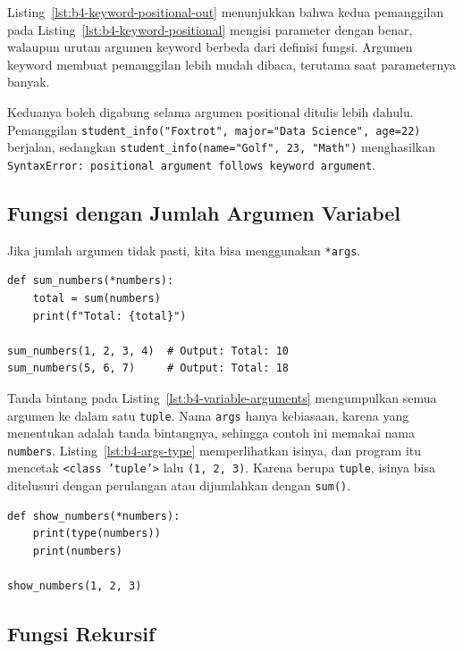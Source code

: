 Listing~\ref{lst:b4-keyword-positional-out} menunjukkan bahwa kedua pemanggilan pada Listing~\ref{lst:b4-keyword-positional} mengisi parameter dengan benar, walaupun urutan argumen keyword berbeda dari definisi fungsi. Argumen keyword membuat pemanggilan lebih mudah dibaca, terutama saat parameternya banyak.

Keduanya boleh digabung selama argumen positional ditulis lebih dahulu. Pemanggilan \texttt{student_info("Foxtrot", major="Data Science", age=22)} berjalan, sedangkan \texttt{student_info(name="Golf", 23, "Math")} menghasilkan \texttt{SyntaxError: positional argument follows keyword argument}.

\subsection{Fungsi dengan Jumlah Argumen Variabel}

Jika jumlah argumen tidak pasti, kita bisa menggunakan \texttt{*args}.

\begin{lstlisting}[style=PythonStyle, caption={Kode Python: function_with_variable_arguments.py}, label={lst:b4-variable-arguments}]
def sum_numbers(*numbers):
    total = sum(numbers)
    print(f"Total: {total}")

sum_numbers(1, 2, 3, 4)  # Output: Total: 10
sum_numbers(5, 6, 7)     # Output: Total: 18
\end{lstlisting}

Tanda bintang pada Listing~\ref{lst:b4-variable-arguments} mengumpulkan semua argumen ke dalam satu \texttt{tuple}. Nama \texttt{args} hanya kebiasaan, karena yang menentukan adalah tanda bintangnya, sehingga contoh ini memakai nama \texttt{numbers}. Listing~\ref{lst:b4-args-type} memperlihatkan isinya, dan program itu mencetak \texttt{<class 'tuple'>} lalu \texttt{(1, 2, 3)}. Karena berupa \texttt{tuple}, isinya bisa ditelusuri dengan perulangan atau dijumlahkan dengan \texttt{sum()}.

\begin{lstlisting}[style=PythonStyle, caption={Kode Python: isi_args.py}, label={lst:b4-args-type}]
def show_numbers(*numbers):
    print(type(numbers))
    print(numbers)

show_numbers(1, 2, 3)
\end{lstlisting}

\subsection{Fungsi Rekursif}

